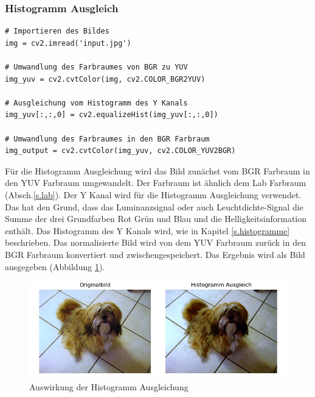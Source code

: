 \documentclass[a4paper,12pt,oneside]{article}
\begin{document}
\subsubsection{Histogramm Ausgleich}
\begin{lstlisting}
# Importieren des Bildes
img = cv2.imread('input.jpg')

# Umwandlung des Farbraumes von BGR zu YUV
img_yuv = cv2.cvtColor(img, cv2.COLOR_BGR2YUV)

# Ausgleichung vom Histogramm des Y Kanals
img_yuv[:,:,0] = cv2.equalizeHist(img_yuv[:,:,0])

# Umwandlung des Farbraumes in den BGR Farbraum
img_output = cv2.cvtColor(img_yuv, cv2.COLOR_YUV2BGR)
\end{lstlisting}
Für die Histogramm Ausgleichung \cite{histogram2012equalisation} wird das Bild zunächst vom BGR Farbraum in den YUV Farbraum umgewandelt. Der Farbraum ist ähnlich dem Lab Farbraum (Absch.\ref{s.lab}). Der Y Kanal wird für die Histogramm Ausgleichung verwendet. Das hat den Grund, dass das Luminanzsignal oder auch Leuchtdichte-Signal die Summe der drei Grundfarben Rot Grün und Blau und die Helligkeitsinformation enthält. Das Histogramm des Y Kanals wird, wie in Kapitel \ref{s.histogramme} beschrieben. Das normalisierte Bild wird von dem YUV Farbraum zurück in den BGR Farbraum konvertiert und zwischengespeichert. Das Ergebnis wird als Bild ausgegeben (Abbildung \ref{img:histogrameq}).
\begin{figure}
	[h]
	\centering
	\includegraphics[scale=0.7]{Sources/histeq.jpg}
	\caption{Auswirkung der Histogramm Ausgleichung}
	\label{img:histogrameq}
\end{figure}
\newpage	
\end{document}
